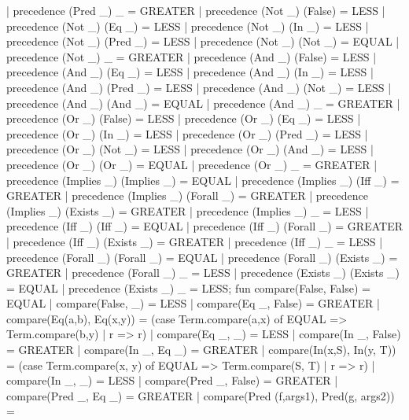   | precedence (Pred _) _ = GREATER
  | precedence (Not _) (False) = LESS
  | precedence (Not _) (Eq _) = LESS
  | precedence (Not _) (In _) = LESS
  | precedence (Not _) (Pred _) = LESS
  | precedence (Not _) (Not _) = EQUAL
  | precedence (Not _) _ = GREATER
  | precedence (And _) (False) = LESS
  | precedence (And _) (Eq _) = LESS
  | precedence (And _) (In _) = LESS
  | precedence (And _) (Pred _) = LESS
  | precedence (And _) (Not _) = LESS
  | precedence (And _) (And _) = EQUAL
  | precedence (And _) _ = GREATER
  | precedence (Or _) (False) = LESS
  | precedence (Or _) (Eq _) = LESS
  | precedence (Or _) (In _) = LESS
  | precedence (Or _) (Pred _) = LESS
  | precedence (Or _) (Not _) = LESS
  | precedence (Or _) (And _) = LESS
  | precedence (Or _) (Or _) =  EQUAL
  | precedence (Or _) _ = GREATER
  | precedence (Implies _) (Implies _) = EQUAL
  | precedence (Implies _) (Iff _) = GREATER
  | precedence (Implies _) (Forall _) = GREATER
  | precedence (Implies _) (Exists _) = GREATER
  | precedence (Implies _) _ = LESS
  | precedence (Iff _) (Iff _) = EQUAL
  | precedence (Iff _) (Forall _) = GREATER
  | precedence (Iff _) (Exists _) = GREATER
  | precedence (Iff _) _ = LESS
  | precedence (Forall _) (Forall _) = EQUAL
  | precedence (Forall _) (Exists _) = GREATER
  | precedence (Forall _) _ = LESS
  | precedence (Exists _) (Exists _) = EQUAL
  | precedence (Exists _) _ = LESS;
\eatline
{}\nwendcode{}\nwdocspar
\nwenddocs{}\endmoddef\nwstartdeflinemarkup{}\nwenddeflinemarkup
fun compare(False, False) = EQUAL
  | compare(False, _) = LESS
  | compare(Eq _, False) = GREATER
  | compare(Eq(a,b), Eq(x,y)) =
     (case Term.compare(a,x) of
       EQUAL => Term.compare(b,y)
     | r => r)
  | compare(Eq _, _) = LESS
  | compare(In _, False) = GREATER
  | compare(In _, Eq _) = GREATER
  | compare(In(x,S), In(y, T)) =
     (case Term.compare(x, y) of
       EQUAL => Term.compare(S, T)
     | r => r)
  | compare(In _, _) = LESS
  | compare(Pred _, False) = GREATER
  | compare(Pred _, Eq _) = GREATER
  | compare(Pred (f,args1), Pred(g, args2)) =
